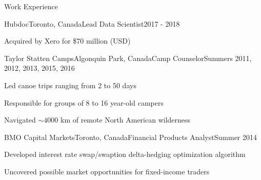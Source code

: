 \documentclass{resume} %
\begin{document}
\begin{rSection}{Work Experience}
\begin{rSubsection}{Hubdoc}{Toronto, Canada}{Lead Data Scientist}{2017 - 2018}
	\item Acquired by Xero for \$70 million (USD)
\end{rSubsection}
\begin{rSubsection}{Taylor Statten Camps}{Algonquin Park, Canada}{Camp Counselor}{Summers 2011, 2012, 2013, 2015, 2016}
	\item Led canoe trips ranging from 2 to 50 days
	\item Responsible for groups of 8 to 16 year-old campers
	\item Navigated ${\sim}4000$ km of remote North American wilderness
\end{rSubsection}
\begin{rSubsection}{BMO Capital Markets}{Toronto, Canada}{Financial Products Analyst}{Summer 2014}
	\item Developed interest rate swap/swaption delta-hedging optimization algorithm
	\item Uncovered possible market opportunities for fixed-income traders
\end{rSubsection}

\end{rSection}

\end{document}
